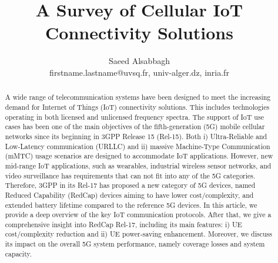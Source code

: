 \documentclass[]{IEEEtran}
\begin{document}
\title{A Survey of Cellular IoT Connectivity Solutions}


\author{Saeed Alsabbagh 


firstname.lastname@uvsq.fr, univ-alger.dz, 
inria.fr
\vspace{0mm}
}


\maketitle

\begin{abstract}
A wide range of telecommunication systems have been designed to meet the increasing demand for Internet of Things (IoT) connectivity solutions.
This includes technologies operating in both licensed and unlicensed frequency spectra.
The support of IoT use cases has been one of the main objectives of the fifth-generation (5G) mobile cellular networks since its beginning in 3GPP Release 15 (Rel-15).
Both i) Ultra-Reliable and Low-Latency communication (URLLC) and ii) massive Machine-Type Communication (mMTC) usage scenarios are designed to accommodate IoT applications.
However, new mid-range IoT applications, such as wearables, industrial wireless sensor networks, and video surveillance has requirements that can not fit into any of the  5G categories.
Therefore, 3GPP in its Rel-17 has proposed a new category of 5G devices, named Reduced Capability (RedCap) devices aiming to have lower cost/complexity, and extended battery lifetime compared to the reference 5G devices.
In this article, we provide a deep overview of the key IoT communication protocols.
After that, we give a comprehensive insight into RedCap Rel-17, including its main features: i) UE cost/complexity reduction and ii) UE power-saving enhancement.
Moreover, we discuss its impact on the overall 5G system performance, namely coverage losses and system capacity.
\end{abstract}
\end{document}
